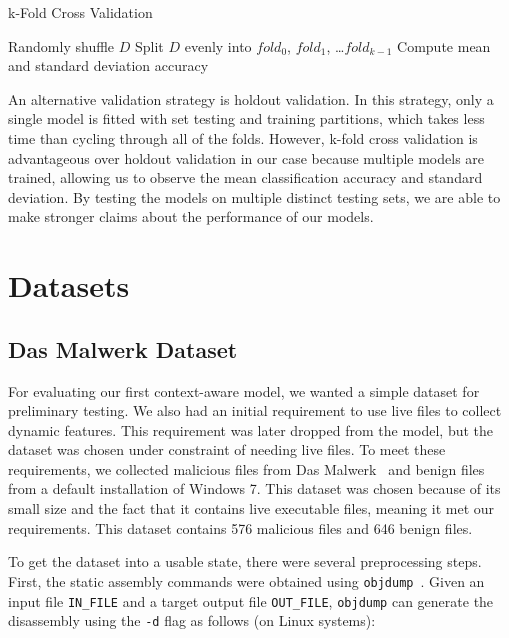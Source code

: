 \documentclass[../stegner_thesis.tex]{subfiles}
\begin{document}
\begin{algorithm}[H]
	\caption{k-Fold Cross Validation}%
	\label{alg:k_fold}
	Randomly shuffle $D$\;
	Split $D$ evenly into $fold_{0}$, $fold_{1}$, \ldots $fold_{k-1}$\;
	Compute mean and standard deviation accuracy\;
\end{algorithm}

\par An alternative validation strategy is holdout validation.
In this strategy, only a single model is fitted with set testing and training
partitions, which takes less time than cycling through all of the folds.
However, k-fold cross validation is advantageous over holdout validation in our
case because multiple models are trained, allowing us to observe the mean
classification accuracy and standard deviation.
By testing the models on multiple distinct testing sets, we are able to make
stronger claims about the performance of our models.

\section{Datasets}%
\label{sec:mthd_datasets}

\subsection{Das Malwerk Dataset}%
\label{subsec:mthd_das_malwerk}

\par For evaluating our first context-aware model, we wanted a simple dataset
for preliminary testing.
We also had an initial requirement to use live files to collect dynamic
features.
This requirement was later dropped from the model, but the dataset was chosen
under constraint of needing live files.
To meet these requirements, we collected malicious files from Das
Malwerk~\cite{svenssonMalwerk} and benign files from a default installation of
Windows 7.
This dataset was chosen because of its small size and the fact that it
contains live executable files, meaning it met our requirements.
This dataset contains 576 malicious files and 646 benign files.

\par To get the dataset into a usable state, there were several preprocessing
steps.
First, the static assembly commands were obtained using
\texttt{objdump}~\cite{ObjdumpLinux}.
Given an input file \texttt{IN\_FILE} and a target output file
\texttt{OUT\_FILE}, \texttt{objdump} can generate the disassembly using the
\texttt{-d} flag as follows (on Linux systems):
\end{document}
